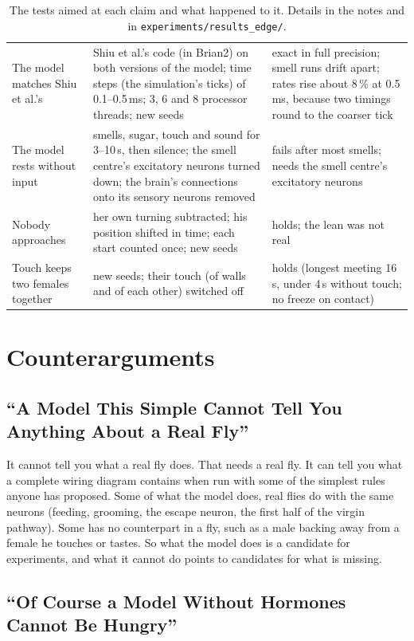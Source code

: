 \begin{table}[tbp]
\begin{tabularx}{\textwidth}{@{}>{\RaggedRight}p{3.9cm}>{\RaggedRight}X>{\RaggedRight\arraybackslash}p{3.3cm}@{}}
The model matches Shiu et al.'s & Shiu et al.'s code (in Brian2) on both versions of the model; time steps (the simulation's ticks) of 0.1--0.5\,ms; 3, 6 and 8 processor threads; new seeds & exact in full precision; smell runs drift apart; rates rise about 8\,\% at 0.5\,ms, because two timings round to the coarser tick \\
The model rests without input & smells, sugar, touch and sound for 3--10\,s, then silence; the smell centre's excitatory neurons turned down; the brain's connections onto its sensory neurons removed & fails after most smells; needs the smell centre's excitatory neurons \\
Nobody approaches & her own turning subtracted; his position shifted in time; each start counted once; new seeds & holds; the lean was not real \\
Touch keeps two females together & new seeds; their touch (of walls and of each other) switched off & holds (longest meeting 16\,s, under 4\,s without touch; no freeze on contact) \\
\bottomrule
\end{tabularx}
\caption{The tests aimed at each claim and what happened to it. Details in the notes and in \texttt{experiments/results\_edge/}.}
\label{tab:breaking}
\end{table}

\section{Counterarguments}
\label{sec:counterarguments}

\subsection{``A Model This Simple Cannot Tell You Anything About a Real Fly''}

It cannot tell you what a real fly does. That needs a real fly. It can tell you what a complete wiring diagram contains when run with some of the simplest rules anyone has proposed. Some of what the model does, real flies do with the same neurons (feeding, grooming, the escape neuron, the first half of the virgin pathway). Some has no counterpart in a fly, such as a male backing away from a female he touches or tastes. So what the model does is a candidate for experiments, and what it cannot do points to candidates for what is missing.

\subsection{``Of Course a Model Without Hormones Cannot Be Hungry''}


